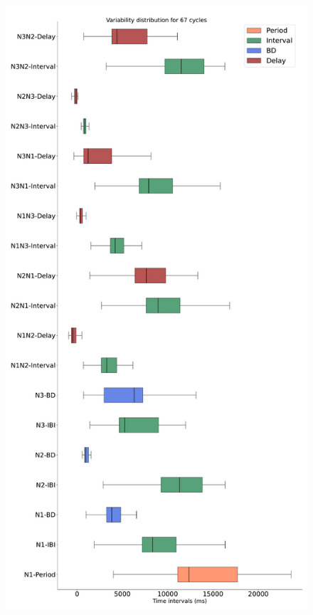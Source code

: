 \begin{figure}[htbp]
\begin{minipage}[b]{0.45\textwidth}
		\includegraphics[width=\textwidth]{./invariants/data/SUSSEX/prep3/images/prep3_3phases_boxplot.pdf}
	\end{minipage}
	\begin{minipage}[b]{0.53\textwidth}
		\centering

\end{minipage}
\end{figure}
